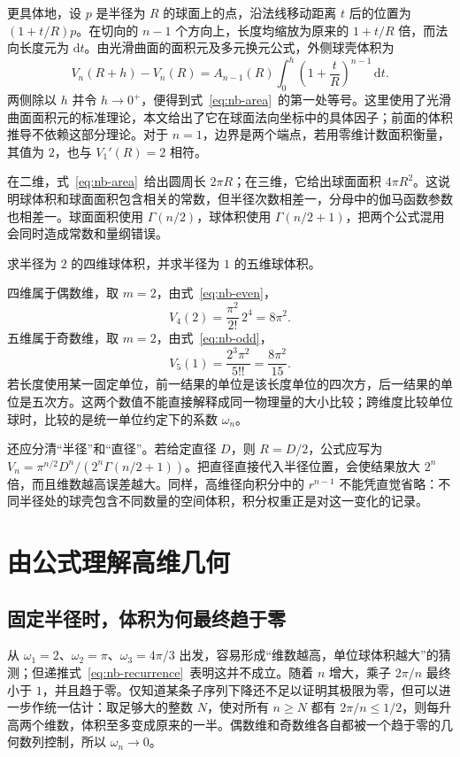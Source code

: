 \documentclass[UTF8,12pt,a4paper,fontset=fandol]{ctexart}
\begin{document}
更具体地，设 $p$ 是半径为 $R$ 的球面上的点，沿法线移动距离 $t$ 后的位置为 $(1+t/R)p$。在切向的 $n-1$ 个方向上，长度均缩放为原来的 $1+t/R$ 倍，而法向长度元为 $\mathrm dt$。由光滑曲面的面积元及多元换元公式，外侧球壳体积为
\[
  V_n(R+h)-V_n(R)
  =A_{n-1}(R)\int_0^h\left(1+\frac tR\right)^{n-1}\,\mathrm dt.
\]
两侧除以 $h$ 并令 $h\to0^+$，便得到式~\eqref{eq:nb-area}~的第一处等号。这里使用了光滑曲面面积元的标准理论，本文给出了它在球面法向坐标中的具体因子；前面的体积推导不依赖这部分理论。对于 $n=1$，边界是两个端点，若用零维计数面积衡量，其值为 $2$，也与 $V_1'(R)=2$ 相符。

在二维，式~\eqref{eq:nb-area}~给出圆周长 $2\pi R$；在三维，它给出球面面积 $4\pi R^2$。这说明球体积和球面面积包含相关的常数，但半径次数相差一，分母中的伽马函数参数也相差一。球面面积使用 $\Gamma(n/2)$，球体积使用 $\Gamma(n/2+1)$，把两个公式混用会同时造成常数和量纲错误。

\begin{example}[四维球与五维球的体积]
求半径为 $2$ 的四维球体积，并求半径为 $1$ 的五维球体积。
\end{example}
\begin{solve}
四维属于偶数维，取 $m=2$，由式~\eqref{eq:nb-even}，
\[
  V_4(2)=\frac{\pi^2}{2!}\,2^4=8\pi^2.
\]
五维属于奇数维，取 $m=2$，由式~\eqref{eq:nb-odd}，
\[
  V_5(1)=\frac{2^3\pi^2}{5!!}=\frac{8\pi^2}{15}.
\]
若长度使用某一固定单位，前一结果的单位是该长度单位的四次方，后一结果的单位是五次方。这两个数值不能直接解释成同一物理量的大小比较；跨维度比较单位球时，比较的是统一单位约定下的系数 $\omega_n$。
\end{solve}

还应分清“半径”和“直径”。若给定直径 $D$，则 $R=D/2$，公式应写为 $V_n=\pi^{n/2}D^n/(2^n\Gamma(n/2+1))$。把直径直接代入半径位置，会使结果放大 $2^n$ 倍，而且维数越高误差越大。同样，高维径向积分中的 $r^{n-1}$ 不能凭直觉省略：不同半径处的球壳包含不同数量的空间体积，积分权重正是对这一变化的记录。

\section{由公式理解高维几何}
\label{sec:nb-high-dimensional}

\subsection{固定半径时，体积为何最终趋于零}

从 $\omega_1=2$、$\omega_2=\pi$、$\omega_3=4\pi/3$ 出发，容易形成“维数越高，单位球体积越大”的猜测；但递推式~\eqref{eq:nb-recurrence}~表明这并不成立。随着 $n$ 增大，乘子 $2\pi/n$ 最终小于 $1$，并且趋于零。仅知道某条子序列下降还不足以证明其极限为零，但可以进一步作统一估计：取足够大的整数 $N$，使对所有 $n\geq N$ 都有 $2\pi/n\leq1/2$，则每升高两个维数，体积至多变成原来的一半。偶数维和奇数维各自都被一个趋于零的几何数列控制，所以 $\omega_n\to0$。
\end{document}
